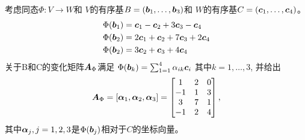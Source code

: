 \begin{example}[变换矩阵]
    考虑同态$\Phi:V \rightarrow W$和
    $V$的有序基$B = (\boldsymbol{b}_1,\dots, \boldsymbol{b}_3)$和
    $W$的有序基$C = (\boldsymbol{c}_1,\dots, \boldsymbol{c}_4)$。
    \begin{equation}
        \begin{aligned}
            \Phi(\boldsymbol{b}_1) &= \boldsymbol{c}_1  - \boldsymbol{c}_2 + 3\boldsymbol{c}_3 -  \boldsymbol{c}_4 \\
            \Phi(\boldsymbol{b}_2) &= 2\boldsymbol{c}_1 + \boldsymbol{c}_2 + 7\boldsymbol{c}_3 + 2\boldsymbol{c}_4 \\
            \Phi(\boldsymbol{b}_2) &=       3\boldsymbol{c}_2 +  \boldsymbol{c}_3 + 4\boldsymbol{c}_4 \\
        \end{aligned}
    \end{equation}
    关于B和C的变化矩阵$\boldsymbol{A}_\Phi$满足
    $\Phi(\boldsymbol{b}_k) = \sum_{1=1}^{4}\alpha_{ik}\boldsymbol{c}_i$
    其中$k=1,\dots,3$, 并给出
    \begin{equation}
        \boldsymbol{A}_\Phi =
        [\boldsymbol{\alpha}_1,\boldsymbol{\alpha}_2,\boldsymbol{\alpha}_3]=
        \begin{bmatrix}
            1 & 2 & 0 \\
            -1 & 1 & 3 \\
            3 & 7 & 1 \\
            -1 & 2 & 4
        \end{bmatrix},
    \end{equation}
    其中$\boldsymbol{\alpha}_j,j = 1, 2, 3$是$\Phi(\boldsymbol{b}_j)$相对于$C$的坐标向量。
\end{example}

